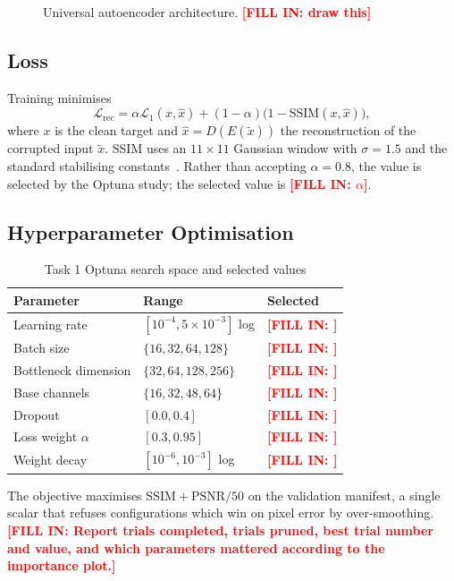 \documentclass[conference]{IEEEtran}
\newcommand{\PLACEHOLDER}[1]{\textcolor{red}{\textbf{[FILL IN: #1]}}}
\begin{document}
\begin{figure}[t]
\centering
\caption{Universal autoencoder architecture. \PLACEHOLDER{draw this}}
\label{fig:task1arch}
\end{figure}

\subsection{Loss}
Training minimises
\begin{equation}
\mathcal{L}_{\text{rec}} = \alpha \mathcal{L}_{1}(x, \hat{x})
  + (1-\alpha)\bigl(1 - \mathrm{SSIM}(x, \hat{x})\bigr),
\end{equation}
where $x$ is the clean target and $\hat{x}=D(E(\tilde{x}))$ the reconstruction
of the corrupted input $\tilde{x}$. SSIM uses an $11\times11$ Gaussian window
with $\sigma=1.5$ and the standard stabilising
constants~\cite{wang2004}. Rather than accepting $\alpha=0.8$, the value is
selected by the Optuna study; the selected value is \PLACEHOLDER{$\alpha$}.

\subsection{Hyperparameter Optimisation}
\begin{table}[t]
\caption{Task 1 Optuna search space and selected values}
\label{tab:task1optuna}
\centering
\begin{tabular}{@{}lll@{}}
\toprule
\textbf{Parameter} & \textbf{Range} & \textbf{Selected} \\
\midrule
Learning rate & $[10^{-4}, 5\times10^{-3}]$ log & \PLACEHOLDER{} \\
Batch size & $\{16,32,64,128\}$ & \PLACEHOLDER{} \\
Bottleneck dimension & $\{32,64,128,256\}$ & \PLACEHOLDER{} \\
Base channels & $\{16,32,48,64\}$ & \PLACEHOLDER{} \\
Dropout & $[0.0, 0.4]$ & \PLACEHOLDER{} \\
Loss weight $\alpha$ & $[0.3, 0.95]$ & \PLACEHOLDER{} \\
Weight decay & $[10^{-6}, 10^{-3}]$ log & \PLACEHOLDER{} \\
\bottomrule
\end{tabular}
\end{table}

The objective maximises $\mathrm{SSIM} + \mathrm{PSNR}/50$ on the validation
manifest, a single scalar that refuses configurations which win on pixel error
by over-smoothing. \PLACEHOLDER{Report trials completed, trials pruned, best
trial number and value, and which parameters mattered according to the
importance plot.}
\end{document}
